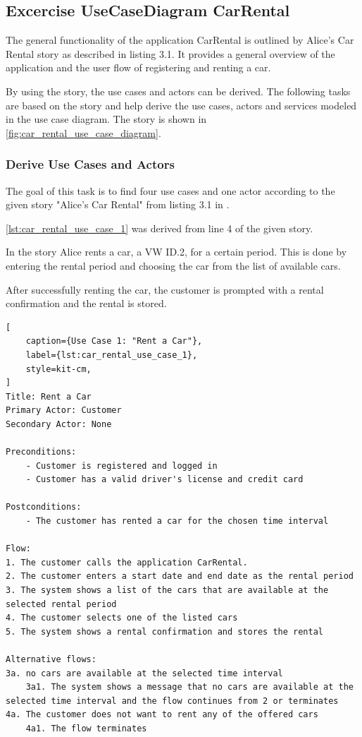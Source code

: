 \subsection{Excercise UseCaseDiagram CarRental}
\label{sec:exercise_use_case_diagram_car_rental}
The general functionality of the application CarRental is outlined by Alice's Car Rental story as described in \cite{CM-T-GO} listing 3.1.
It provides a general overview of the application and the user flow of registering and renting a car.

By using the story, the use cases and actors can be derived.
The following tasks are based on the story and help derive the use cases, actors and services modeled in the use case diagram.
The story is shown in \autoref{fig:car_rental_use_case_diagram}.

\subsubsection*{Derive Use Cases and Actors}
The goal of this task is to find four use cases and one actor according to the given story "Alice's Car Rental" from listing 3.1 in \cite{CM-T-GO}.

\autoref{lst:car_rental_use_case_1} was derived from line 4 of the given story.

In the story Alice rents a car, a VW ID.2, for a certain period.
This is done by entering the rental period and choosing the car from the list of available cars.

After successfully renting the car, the customer is prompted with a rental confirmation and the rental is stored.

\begin{lstlisting}[
    caption={Use Case 1: "Rent a Car"},
    label={lst:car_rental_use_case_1},
    style=kit-cm,
]
Title: Rent a Car
Primary Actor: Customer
Secondary Actor: None

Preconditions:
    - Customer is registered and logged in
    - Customer has a valid driver's license and credit card

Postconditions:
    - The customer has rented a car for the chosen time interval

Flow:
1. The customer calls the application CarRental.
2. The customer enters a start date and end date as the rental period
3. The system shows a list of the cars that are available at the selected rental period
4. The customer selects one of the listed cars
5. The system shows a rental confirmation and stores the rental

Alternative flows:
3a. no cars are available at the selected time interval
    3a1. The system shows a message that no cars are available at the selected time interval and the flow continues from 2 or terminates
4a. The customer does not want to rent any of the offered cars
    4a1. The flow terminates    
\end{lstlisting}

